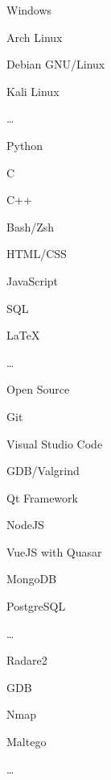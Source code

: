\SmallSep

\begin{multicols}{3}
\begin{compactitem}[\color{Cyan}$\circ$]
	\item Windows
	\item Arch Linux
	\item Debian GNU/Linux
	\item Kali Linux
	\item \ldots
\end{compactitem}
\end{multicols}

\SmallSep

\begin{multicols}{3}
\begin{compactitem}[\color{Cyan}$\circ$]
    \item Python
	\item C
    \item C++
    \item Bash/Zsh
    \item HTML/CSS
    \item JavaScript
    \item SQL
    \item \LaTeX
	\item \ldots
\end{compactitem}
\end{multicols}

\SmallSep

\begin{multicols}{3}
\begin{compactitem}[\color{Cyan}$\circ$]
    \item Open Source \heart\
    \item Git
    \item Visual Studio Code
    \item GDB/Valgrind
    \item Qt Framework
    \item NodeJS
    \item VueJS with Quasar
    \item MongoDB
    \item PostgreSQL
    \item \ldots
\end{compactitem}
\end{multicols}

\SmallSep

\begin{multicols}{3}
\begin{compactitem}[\color{Cyan}$\circ$]
    \item Radare2
    \item GDB
    \item Nmap
    \item Maltego
    \item \ldots
\end{compactitem}
\end{multicols}

